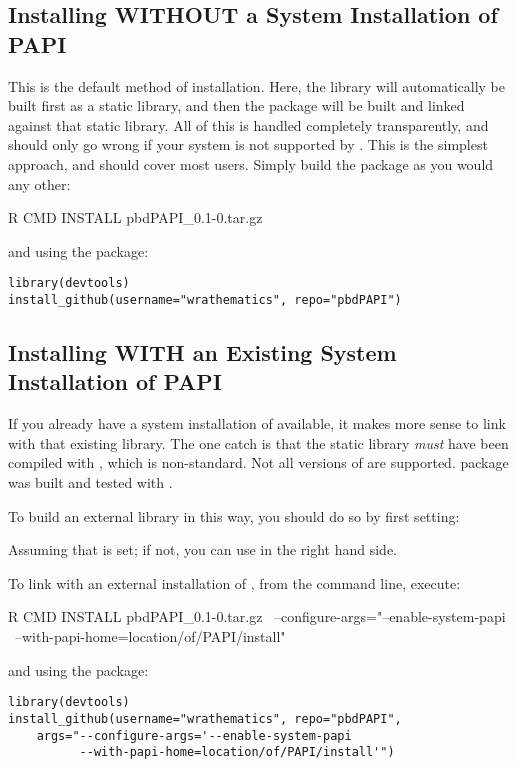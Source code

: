 \subsection{Installing WITHOUT a System Installation of PAPI}

This is the default method of installation.  Here, the \PAPI library will  
automatically be built first as a static library, and then the \thispackage 
package will be built and linked against that static library.  All of this is 
handled completely transparently, and should only go wrong if your system is not 
supported by \PAPI.  This is the simplest approach, and should cover most users. 
 Simply build the package as you would any other:
\begin{Command}
R CMD INSTALL pbdPAPI_0.1-0.tar.gz
\end{Command}
and using the  package:
\begin{lstlisting}[language=rr]
library(devtools)
install_github(username="wrathematics", repo="pbdPAPI")
\end{lstlisting}




\subsection{Installing WITH an Existing System Installation of PAPI}

If you already have a system installation of \PAPI available, it makes more  
sense to link with that existing library.  The one catch is that the static 
library \emph{must} have been compiled with , which is 
non-standard. Not all versions of \PAPI are supported.  \thispackage package 
was built and tested with \PAPI \PAPIversion.


 To build an external \PAPI library in this way, you should do so by first 
setting:
Assuming that  is set; if not, you can use  in the right hand 
side.

To link with an external installation of \PAPI, from the command line, execute:
\begin{Command}
R CMD INSTALL pbdPAPI_0.1-0.tar.gz \ 
    --configure-args="--enable-system-papi \ 
    --with-papi-home=location/of/PAPI/install"
\end{Command}
and using the  package:
\begin{lstlisting}
library(devtools)
install_github(username="wrathematics", repo="pbdPAPI", 
    args="--configure-args='--enable-system-papi 
          --with-papi-home=location/of/PAPI/install'")
\end{lstlisting}
